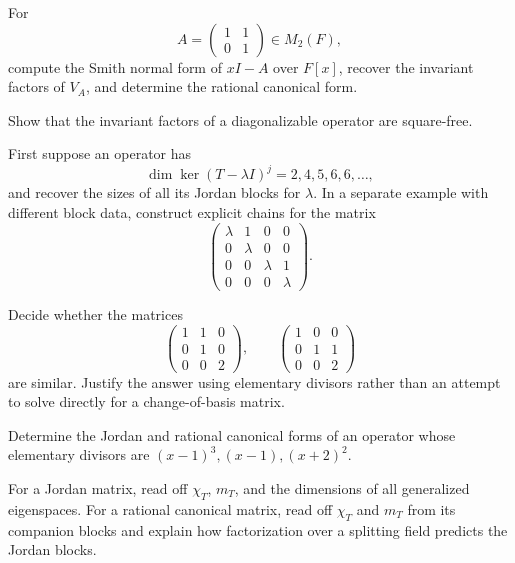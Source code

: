 \begin{exercise}[Core] For
\[
A=\begin{pmatrix}1&1\\0&1\end{pmatrix}\in M_2(F),
\]
compute the Smith normal form of \(xI-A\) over \(F[x]\), recover the invariant
factors of \(V_A\), and determine the rational canonical form.\end{exercise}
\begin{exercise}[Further] Show that the invariant factors of a diagonalizable
operator are square-free.\end{exercise}
\begin{exercise}[Further] First suppose an operator has
\[
\dim\ker(T-\lambda I)^j=2,4,5,6,6,\ldots,
\]
and recover the sizes of all its Jordan blocks for \(\lambda\).  In a
separate example with different block data, construct explicit chains for
the matrix
\[
\begin{pmatrix}
\lambda&1&0&0\\0&\lambda&0&0\\
0&0&\lambda&1\\0&0&0&\lambda
\end{pmatrix}.
\]\end{exercise}
\begin{exercise}[Further] Decide whether the matrices
\[
\begin{pmatrix}1&1&0\\0&1&0\\0&0&2\end{pmatrix},
\qquad
\begin{pmatrix}1&0&0\\0&1&1\\0&0&2\end{pmatrix}
\]
are similar.  Justify the answer using elementary divisors rather than an
attempt to solve directly for a change-of-basis matrix.\end{exercise}
\begin{exercise} Determine the Jordan and rational
canonical forms of an operator whose elementary divisors are
\((x-1)^3,(x-1),(x+2)^2\).\end{exercise}
\begin{exercise} For a Jordan matrix, read off
\(\chi_T\), \(m_T\), and the dimensions of all generalized eigenspaces.
For a rational canonical matrix, read off \(\chi_T\) and \(m_T\) from its
companion blocks and explain how factorization over a splitting field predicts
the Jordan blocks.\end{exercise}
